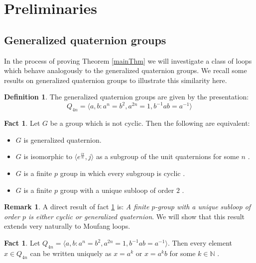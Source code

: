 \documentclass[12pt]{report}
\theoremstyle{definition}
\newtheorem{fct}[thm]{Fact}
\newtheorem{dfn}[thm]{Definition}
\newtheorem*{rmk}{Remark}
\newcommand{\NNN}{\mathbb{N}}
\begin{document}

\section{Preliminaries}

\subsection{Generalized quaternion groups}

In the process of proving Theorem \ref{mainThm} we will investigate a class of loops which behave analogously
  to the generalized quaternion groups. We recall some results on generalized quaternion groups to illustrate
  this similarity here.

\begin{dfn}
  The generalized quaternion groups are given by the presentation:
  \[Q_{4n} = \langle a, b : a^n = b^2, a^{2n} = 1, b^{-1}ab = a^{-1}\rangle\]
\end{dfn}

\begin{fct}\label{fct:genQuat}
  Let $G$ be a group which is not cyclic. Then the following are equivalent:
  \begin{itemize}
    \item $G$ is generalized quaternion.
    \item $G$ is isomorphic to $\langle e^{\frac{i\pi}{n}}, j\rangle$ as a subgroup of the unit
      quaternions for some $n$ \cite{Brown}.
    \item $G$ is a finite $p$ group in which every subgroup is cyclic \cite{Cartan}.
    \item $G$ is a finite $p$ group with a unique subloop of order $2$ \cite{Brown}.
  \end{itemize}
\end{fct}

\begin{rmk}
  A direct result of fact \ref{fct:genQuat} is: \emph{A finite $p$-group with a unique subloop of order $p$ is
    either cyclic or generalized quaternion}. We will show that this result extends very naturally to Moufang loops.
\end{rmk}

\begin{fct}\label{fct:genQuat-rep}
  Let $Q_{4n} = \langle a, b : a^n = b^2, a^{2n} = 1, b^{-1}ab = a^{-1}\rangle$. Then every element $x \in Q_{4n}$
    can be written uniquely as $x = a^k$ or $x = a^k b$ for some $k\in\NNN$ \cite{genQuat}.
\end{fct}
\end{document}
